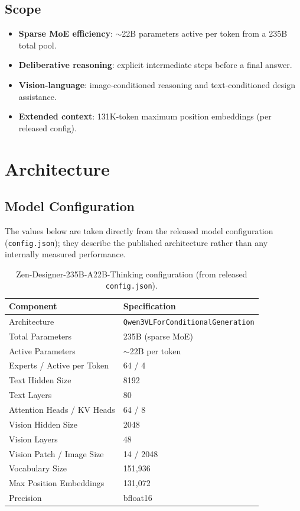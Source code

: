 \documentclass[11pt,a4paper]{article}
\begin{document}
\subsection{Scope}
\begin{itemize}
    \item \textbf{Sparse MoE efficiency}: $\sim$22B parameters active per token from a 235B total pool.
    \item \textbf{Deliberative reasoning}: explicit intermediate steps before a final answer.
    \item \textbf{Vision-language}: image-conditioned reasoning and text-conditioned design assistance.
    \item \textbf{Extended context}: 131K-token maximum position embeddings (per released config).
\end{itemize}

\section{Architecture}

\subsection{Model Configuration}

The values below are taken directly from the released model configuration
(\texttt{config.json}); they describe the published architecture rather than any internally
measured performance.

\begin{table}[H]
\centering
\begin{tabular}{ll}
\toprule
\textbf{Component} & \textbf{Specification} \\
\midrule
Architecture & \texttt{Qwen3VLForConditionalGeneration} \\
Total Parameters & 235B (sparse MoE) \\
Active Parameters & $\sim$22B per token \\
Experts / Active per Token & 64 / 4 \\
Text Hidden Size & 8192 \\
Text Layers & 80 \\
Attention Heads / KV Heads & 64 / 8 \\
Vision Hidden Size & 2048 \\
Vision Layers & 48 \\
Vision Patch / Image Size & 14 / 2048 \\
Vocabulary Size & 151{,}936 \\
Max Position Embeddings & 131{,}072 \\
Precision & bfloat16 \\
\bottomrule
\end{tabular}
\caption{Zen-Designer-235B-A22B-Thinking configuration (from released \texttt{config.json}).}
\end{table}
\end{document}
